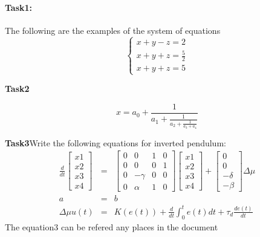 \documentclass{report}
\begin{document}
	\paragraph{\textbf{Task1:}}The following are the examples of the system of equations\\
	\begin{equation}\nonumber
	\begin{cases}
		x+y-z=2\\	
		x+y+z=\frac{5}{2}\\
		x+y+z=5
	\end{cases}
	\end{equation}
	\begin{multicols}{2}
		\begin{flushleft}
			\textbf{Task2}
		\end{flushleft}
		$$x=a_0 + \frac{1}{a_1 + \frac{1}{a_2 + \frac{1}{a_3+a_4}}}$$
		\blindtext[2]
	\end{multicols}
	\textbf{Task3}Write the following equations for inverted pendulum:
	\begin{eqnarray}
	\frac{d}{dt}
	\begin{bmatrix}
	x1\\x2\\x3\\x4
	\end{bmatrix} &=& \begin{bmatrix}
	0&0&1&0\\0&0&0&1\\0&-\gamma&0&0\\0&\alpha&1&0
	\end{bmatrix} \begin{bmatrix}
	x1\\x2\\x3\\x4
	\end{bmatrix} + 
	\begin{bmatrix}
	0\\0\\-\delta\\-\beta
	\end{bmatrix} \Delta\mu\\
	a&=&b\\\Delta\mu u(t) &=& K(e(t))+\frac{d}{dt}\int_{0}^{t}e(t)dt+\tau_d\frac{de(t)}{dt}
	\end{eqnarray}
	The \color{red}equation3 \color{black}can be refered any places in the document
\end{document}
